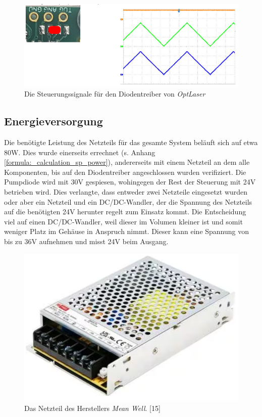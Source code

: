 \begin{figure}[H]
    \centering
    \includegraphics[scale=0.75, trim={70mm 0mm 0mm 0mm}, clip]{98_images/ldd_schema_modus.PNG}
    \caption{Die Steuerungssignale für den Diodentreiber von \textit{OptLaser}}
    \label{fig:diodentreiber_modus_hw}
\end{figure}

\subsection{Energieversorgung}
Die benötigte Leistung des Netzteils für das gesamte System beläuft sich auf etwa 80W. Dies wurde einerseits errechnet (s. Anhang \ref{formula:_calculation_sp_power}), andererseits mit einem Netzteil an dem alle Komponenten, bis auf den Diodentreiber angeschlossen wurden verifiziert. Die Pumpdiode wird mit 30V gespiesen, wohingegen der Rest der Steuerung mit 24V betrieben wird. Dies verlangte, dass entweder zwei Netzteile eingesetzt wurden oder aber ein Netzteil und ein DC/DC-Wandler, der die Spannung des Netzteils auf die benötigten 24V herunter regelt zum Einsatz kommt. Die Entscheidung viel auf einen DC/DC-Wandler, weil dieser im Volumen kleiner ist und somit weniger Platz im Gehäuse in Anspruch nimmt. Dieser kann eine Spannung von bis zu 36V aufnehmen und misst 24V beim Ausgang.

\begin{figure}[H]
    \centering
    \includegraphics[scale=0.7]{98_images/controller_ps.PNG}
    \caption{Das Netzteil des Herstellers \textit{Mean Well}. [15]}
    \label{fig:controller_ps_hw}
\end{figure}

